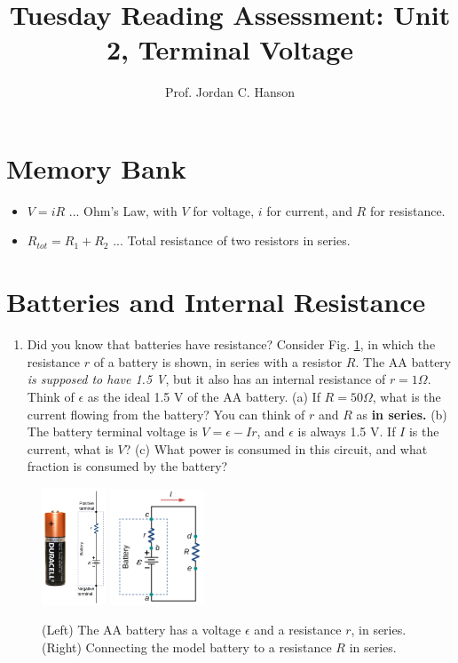 \documentclass{article}
\begin{document}
\title{Tuesday Reading Assessment: Unit 2, Terminal Voltage}
\author{Prof. Jordan C. Hanson}

\maketitle

\section{Memory Bank}

\begin{itemize}
\item $V = i R$ ... Ohm's Law, with $V$ for voltage, $i$ for current, and $R$ for resistance.
\item $R_{tot} = R_1 + R_2$ ... Total resistance of two resistors in series.
\end{itemize}

\section{Batteries and Internal Resistance}

\begin{enumerate}
\item Did you know that batteries have resistance?  Consider Fig. \ref{fig:1}, in which the resistance $r$ of a battery is shown, in series with a resistor $R$.  The AA battery \textit{is supposed to have 1.5 V}, but it also has an internal resistance of $r = 1\Omega$.  Think of $\epsilon$ as the ideal 1.5 V of the AA battery.  (a) If $R = 50\Omega$, what is the current flowing from the battery?  You can think of $r$ and $R$ as \textbf{in series.}  (b) The battery terminal voltage is $V = \epsilon - Ir$, and $\epsilon$ is always 1.5 V.  If $I$ is the current, what is $V$? (c) What power is consumed in this circuit, and what fraction is consumed by the battery?
\end{enumerate}

\begin{figure}
\centering
\includegraphics[width=0.17\textwidth]{duracell.png} \hspace{3cm}
\includegraphics[width=0.25\textwidth]{duracell2.png}
\caption{\label{fig:1}(Left) The AA battery has a voltage $\epsilon$ and a resistance $r$, in series.  (Right) Connecting the model battery to a resistance $R$ in series.}
\end{figure}
\end{document}
